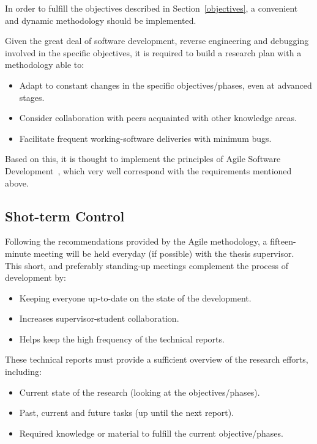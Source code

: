 In order to fulfill the objectives described in Section~\ref{objectives}, a convenient and dynamic methodology should be implemented.

Given the great deal of software development, reverse engineering and debugging involved in the specific objectives, it is required to build a research plan with a methodology able to: 
\begin{itemize}
	\item Adapt to constant changes in the specific objectives/phases, even at advanced stages.
	\item Consider collaboration with peers acquainted with other knowledge areas.
	\item Facilitate frequent working-software deliveries with minimum bugs.
\end{itemize}

Based on this, it is thought to implement the principles of Agile Software Development~\cite{agileAlliance,agileManifesto}, which very well correspond with the requirements mentioned above.

\subsection{Shot-term Control}\label{shot-termContol}
Following the recommendations provided by the Agile methodology, a fifteen-minute meeting will be held everyday (if possible) with the thesis supervisor. This short, and preferably standing-up meetings complement the process of development by:

\begin{itemize}
	\item Keeping everyone up-to-date on the state of the development.
	\item Increases supervisor-student collaboration.
	\item Helps keep the high frequency of the technical reports.
\end{itemize}

These technical reports must provide a sufficient overview of the research efforts, including:

\begin{itemize}
	\item Current state of the research (looking at the objectives/phases).
	\item Past, current and future tasks (up until the next report).
	\item Required knowledge or material to fulfill the current objective/phases.
\end{itemize}

